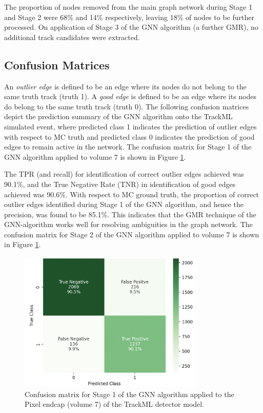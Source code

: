 The proportion of nodes removed from the main graph network during Stage 1 and Stage 2 were 68\% and 14\% respectively, leaving 18\% of nodes to be further processed. On application of Stage 3 of the GNN algorithm (a further GMR), no additional track candidates were extracted.


\subsection{Confusion Matrices}
\label{confusion-matrices-endcap-trackml}

An \textit{outlier edge} is defined to be an edge where its nodes do not belong to the same truth track (truth 1). A \textit{good edge} is defined to be an edge where its nodes do belong to the same truth track (truth 0). The following confusion matrices depict the prediction summary of the GNN algorithm onto the TrackML simulated event, where predicted class 1 indicates the prediction of outlier edges with respect to MC truth and predicted class 0 indicates the prediction of good edges to remain active in the network. The confusion matrix for Stage 1 of the GNN algorithm applied to volume 7 is shown in Figure \ref{fig:confusion-matrix-endcap-stage-1}.


The TPR (and recall) for identification of correct outlier edges achieved was 90.1\%, and the True Negative Rate (TNR) in identification of good edges achieved was 90.6\%. With respect to MC ground truth, the proportion of correct outlier edges identified during Stage 1 of the GNN algorithm, and hence the precision, was found to be 85.1\%. This indicates that the GMR technique of the GNN-algorithm works well for resolving ambiguities in the graph network. The confusion matrix for Stage 2 of the GNN algorithm applied to volume 7 is shown in Figure \ref{fig:confusion-matrix-endcap-stage-1}.

\begin{figure}[htbp]
    \centering
    \includegraphics[width=0.79\textwidth]{images/7-results/confusion_matrix_endcap_stage_1.png}
    \caption{Confusion matrix for Stage 1 of the GNN algorithm applied to the Pixel endcap (volume 7) of the TrackML detector model.}
    \label{fig:confusion-matrix-endcap-stage-1}%
\end{figure}
  

